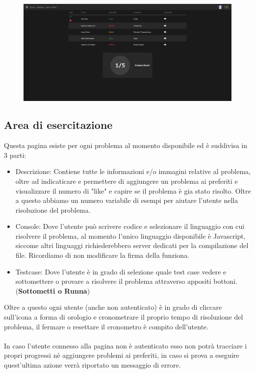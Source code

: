 \documentclass[11pt, a4paper]{article}
\theoremstyle{definition}
\begin{document}
\begin{figure}[H]
  \centering
  \includegraphics[width=\textwidth]{materiale/sito/Catalogo.png}
\end{figure}

\subsection{Area di esercitazione}
Questa pagina esiste per ogni problema al momento disponibile ed è suddivisa in 3 parti:
\begin{itemize}
  \item Descrizione: Contiene tutte le informazioni e/o immagini relative al problema, oltre ad indicaticare e permettere di aggiungere un problema ai preferiti e visualizzare il numero di "like" e capire se il problema è gia stato risolto. Oltre a questo abbiamo un numero variabile di esempi per aiutare l'utente nella risoluzione del problema.
  \item Console: Dove l'utente può scrivere codice e selezionare il linguaggio con cui risolvere il problema, al momento l'unico linguaggio disponibile è Javascript, siccome altri linguaggi richiederebbero server dedicati per la compilazione del file. Ricordiamo di non modificare la firma della funziona.
  \item Testcase: Dove l'utente è in grado di selezione quale test case vedere e sottomettere o provare a risolvere il problema attraverso appositi bottoni. (\textbf{Sottometti o Runna})
\end{itemize}
Oltre a questo ogni utente (anche non autenticato) è in grado di cliccare sull'icona a forma di orologio e cronometrare il proprio tempo di risoluzione del problema, il fermare o resettare il cronometro è compito dell'utente.\\\\
In caso l'utente connesso alla pagina non è autenticato esso non potrà tracciare i propri progressi nè aggiungere problemi ai preferiti, in caso si prova a eseguire quest'ultima azione verrà riportato un messaggio di errore.\\\\
\end{document}
